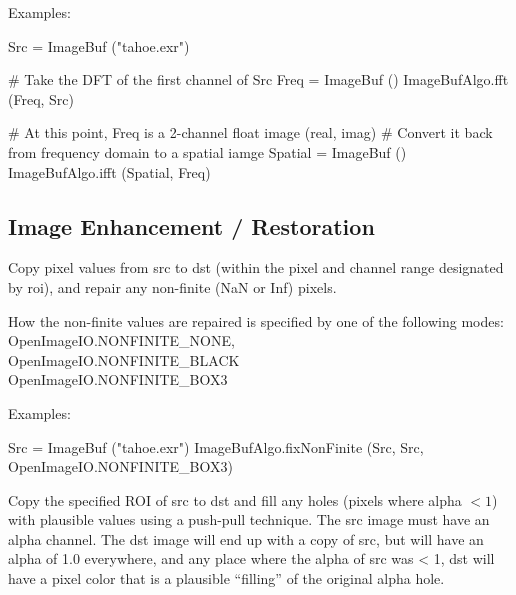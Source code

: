\smallskip
\noindent Examples:
\begin{code}
    Src = ImageBuf ("tahoe.exr")

    # Take the DFT of the first channel of Src
    Freq = ImageBuf ()
    ImageBufAlgo.fft (Freq, Src)

    # At this point, Freq is a 2-channel float image (real, imag)
    # Convert it back from frequency domain to a spatial iamge
    Spatial = ImageBuf ()
    ImageBufAlgo.ifft (Spatial, Freq)
\end{code}
\apiend



\subsection{Image Enhancement / Restoration}
\label{sec:iba:py:enhance}

 

Copy pixel values from {\cf src} to {\cf dst} (within the pixel and channel
range designated by {\cf roi}), and repair any non-finite ({\cf NaN} or {\cf
Inf}) pixels.

How the non-finite values are repaired is specified by one of the
following modes: \\
{\cf OpenImageIO.NONFINITE_NONE}, \\
{\cf OpenImageIO.NONFINITE_BLACK} \\ 
{\cf OpenImageIO.NONFINITE_BOX3}

\smallskip
\noindent Examples:
\begin{code}
    Src = ImageBuf ("tahoe.exr")
    ImageBufAlgo.fixNonFinite (Src, Src, OpenImageIO.NONFINITE_BOX3)
\end{code}
\apiend


 
Copy the specified ROI of {\cf src} to {\cf dst} and fill any 
holes (pixels where alpha $< 1$) with plausible values using a push-pull
technique.  The {\cf src} image must have
an alpha channel.  The dst image will end up with a copy of src, but
will have an alpha of 1.0 everywhere, and any place where the alpha
of src was < 1, dst will have a pixel color that is a plausible
``filling'' of the original alpha hole.

